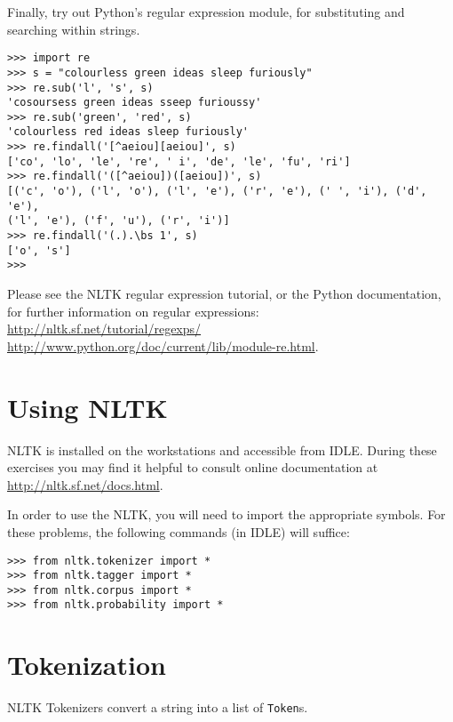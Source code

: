 \documentclass{worksheet}
\begin{document}
Finally, try out Python's regular expression module, for substituting and searching within
strings.

\begin{verbatim}
>>> import re
>>> s = "colourless green ideas sleep furiously"
>>> re.sub('l', 's', s)
'cosoursess green ideas sseep furioussy'
>>> re.sub('green', 'red', s)
'colourless red ideas sleep furiously'
>>> re.findall('[^aeiou][aeiou]', s)
['co', 'lo', 'le', 're', ' i', 'de', 'le', 'fu', 'ri']
>>> re.findall('([^aeiou])([aeiou])', s)
[('c', 'o'), ('l', 'o'), ('l', 'e'), ('r', 'e'), (' ', 'i'), ('d', 'e'),
('l', 'e'), ('f', 'u'), ('r', 'i')]
>>> re.findall('(.).\bs 1', s)
['o', 's']
>>> 
\end{verbatim}

Please see the NLTK regular expression tutorial, or the
Python documentation, for further information on regular expressions:\\
\url{http://nltk.sf.net/tutorial/regexps/}\\
\url{http://www.python.org/doc/current/lib/module-re.html}.

\pagebreak

\section*{Using NLTK}

NLTK is installed on the workstations and accessible from IDLE.
During these exercises you may find it helpful to consult online
documentation at \url{http://nltk.sf.net/docs.html}.

In order to use the NLTK, you will need to import the appropriate
symbols.  For these problems, the following commands (in IDLE) will
suffice:

\begin{verbatim}
>>> from nltk.tokenizer import * 
>>> from nltk.tagger import * 
>>> from nltk.corpus import * 
>>> from nltk.probability import *
\end{verbatim}

\section*{Tokenization}

NLTK Tokenizers convert a string into a list of \texttt{Token}s.
\end{document}
